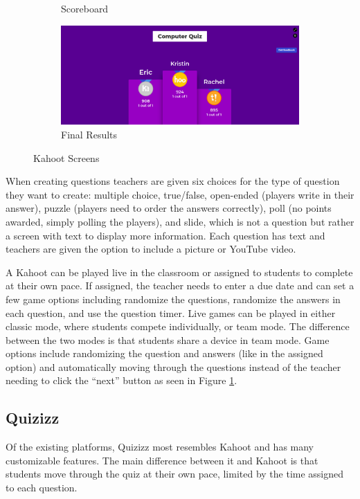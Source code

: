 \documentclass{article}
\begin{document}
\begin{figure}[ht]
\begin{subfigure}[b]{0.49\textwidth}
                \caption{Scoreboard}
                \label{fig:kahoot-scoreboard}
            \end{subfigure}
            \begin{subfigure}[b]{0.49\textwidth}
                \includegraphics[width=\textwidth]{images/kahoot-finished.png}
                \caption{Final Results}
                \label{fig:kahoot-final}
            \end{subfigure}
            \caption{Kahoot Screens \cite{kahoot}}\label{fig:kahoot}
        \end{figure}
        
        When creating questions teachers are given six choices for the type of question they want to create: multiple choice, true/false, open-ended (players write in their answer), puzzle (players need to order the answers correctly), poll (no points awarded, simply polling the players), and slide, which is not a question but rather a screen with text to display more information. Each question has text and teachers are given the option to include a picture or YouTube video.
        \smallskip
        
        A Kahoot can be played live in the classroom or assigned to students to complete at their own pace. If assigned, the teacher needs to enter a due date and can set a few game options including randomize the questions, randomize the answers in each question, and use the question timer. Live games can be played in either classic mode, where students compete individually, or team mode. The difference between the two modes is that students share a device in team mode. Game options include randomizing the question and answers (like in the assigned option) and automatically moving through the questions instead of the teacher needing to click the ``next'' button as seen in Figure \ref{fig:kahoot-scoreboard}.

    \subsection{Quizizz}
        Of the existing platforms, Quizizz most resembles Kahoot and has many customizable features. The main difference between it and Kahoot is that students move through the quiz at their own pace, limited by the time assigned to each question.
        \smallskip
        
\end{document}
